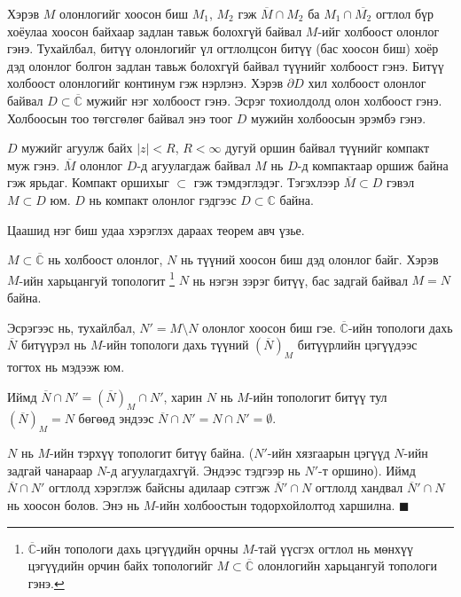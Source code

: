 \begin{dfn}
Хэрэв $M$ олонлогийг хоосон биш  $M_1$, $M_2$ гэж $\overline{M}\cap M_2$ ба $M_1\cap \overline{M_2}$ огтлол бүр хоёулаа хоосон байхаар задлан тавьж болохгүй байвал $M$-ийг холбоост олонлог гэнэ. Тухайлбал, битүү олонлогийг үл огтлолцсон битүү (бас хоосон биш) хоёр дэд олонлог болгон задлан тавьж болохгүй байвал түүнийг холбоост гэнэ. Битүү холбоост олонлогийг континум  гэж нэрлэнэ.
Хэрэв $\partial D$ хил холбоост олонлог байвал $D\subset \overline{\mathbb{C}}$ мужийг нэг холбоост гэнэ. Эсрэг тохиолдолд олон холбоост  гэнэ. Холбоосын тоо төгсгөлөг байвал энэ тоог $D$ мужийн холбоосын эрэмбэ  гэнэ.

$D$ мужийг агуулж байх $|z|<R$, $R<\infty$ дугуй оршин байвал түүнийг компакт муж  гэнэ. $\overline{M}$ олонлог $D$-д агуулагдаж байвал $M$ нь $D$-д компактаар оршиж байна гэж ярьдаг. Компакт оршихыг $\subset$ гэж тэмдэглэдэг. Тэгэхлээр $\overline{M}\subset D$ гэвэл $M\subset D$ юм. $D$ нь компакт олонлог гэдгээс $D\subset \mathbb{C}$ байна.

Цаашид нэг биш удаа хэрэглэх дараах теорем авч үзье. 
\end{dfn}
\begin{thm}
$M\subset \overline{\mathbb{C}}$ нь холбоост олонлог, $N$ нь түүний хоосон биш дэд олонлог байг. Хэрэв $M$-ийн харьцангуй топологит \footnote{$\overline{\mathbb{C}}$-ийн топологи дахь цэгүүдийн орчны $M$-тай үүсгэх огтлол нь мөнхүү цэгүүдийн орчин байх топологийг $M\subset \overline{\mathbb{C}}$ олонлогийн харьцангуй топологи гэнэ.}  $N$ нь нэгэн зэрэг битүү, бас задгай байвал $M=N$ байна.
\end{thm}
\begin{prf}
Эсрэгээс нь, тухайлбал, $N'=M\setminus N$ олонлог хоосон биш гэе. $\overline{\mathbb{C}}$-ийн топологи дахь $\overline{N}$ битүүрэл нь $M$-ийн топологи дахь түүний $(\overline{N})_M$ битүүрлийн цэгүүдээс тогтох нь мэдээж юм.

Иймд $\overline{N}\cap N'=(\overline{N})_M\cap N'$, харин $N$ нь $M$-ийн топологит битүү тул $(\overline{N})_M=N$ бөгөөд эндээс $\overline{N}\cap N'=N\cap N'=\emptyset$.

$N$ нь $M$-ийн тэрхүү топологит битүү байна. ($N'$-ийн хязгаарын цэгүүд $N$-ийн задгай чанараар $N$-д агуулагдахгүй. Эндээс тэдгээр нь $N'$-т оршино). Иймд $\overline{N}\cap N'$ огтлолд хэрэглэж байсны адилаар сэтгэж $\overline{N}'\cap N$ огтлолд хандвал $\overline{N}'\cap N$ нь хоосон болов. Энэ нь $M$-ийн холбоостын тодорхойлолтод харшилна.
\hfill $\blacksquare$\end{prf}
